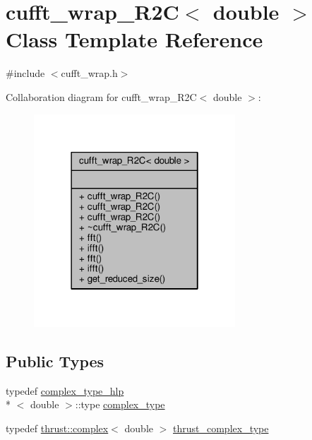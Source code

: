 \hypertarget{classcufft__wrap__R2C_3_01double_01_4}{\section{cufft\-\_\-wrap\-\_\-\-R2\-C$<$ double $>$ Class Template Reference}
\label{classcufft__wrap__R2C_3_01double_01_4}
}


{\ttfamily \#include $<$cufft\-\_\-wrap.\-h$>$}



Collaboration diagram for cufft\-\_\-wrap\-\_\-\-R2\-C$<$ double $>$\-:\nopagebreak
\begin{figure}[H]
\begin{center}
\leavevmode
\includegraphics[width=214pt]{classcufft__wrap__R2C_3_01double_01_4__coll__graph}
\end{center}
\end{figure}
\subsection*{Public Types}
\begin{DoxyCompactItemize}
\item 
typedef \hyperlink{structcomplex__type__hlp}{complex\-\_\-type\-\_\-hlp}\\*
$<$ double $>$\-::type \hyperlink{classcufft__wrap__R2C_3_01double_01_4_ac8d996c3659f68d38626422f74945e06}{complex\-\_\-type}
\item 
typedef \hyperlink{test__deflation__typedefs_8h_a25cabcac5deb559feab415e2c445d8ba}{thrust\-::complex}$<$ double $>$ \hyperlink{classcufft__wrap__R2C_3_01double_01_4_abc41290148d975b62afbb5988527dc43}{thrust\-\_\-complex\-\_\-type}
\end{DoxyCompactItemize}
